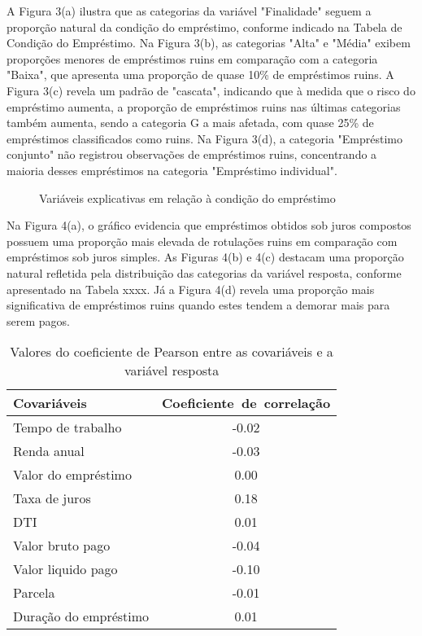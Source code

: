 A Figura 3(a) ilustra que as categorias da variável "Finalidade" seguem a proporção natural da condição do empréstimo,
conforme indicado na Tabela de Condição do Empréstimo. Na Figura 3(b), as categorias "Alta" e "Média"
exibem proporções menores de empréstimos ruins em comparação com a categoria "Baixa", que apresenta uma proporção de quase 10\% 
de empréstimos ruins. A Figura 3(c) revela um padrão de "cascata", indicando que à medida que o risco do 
empréstimo aumenta, a proporção de empréstimos ruins nas últimas categorias também aumenta, 
sendo a categoria G a mais afetada, com quase 25\% de empréstimos classificados como ruins. 
Na Figura 3(d), a categoria "Empréstimo conjunto" não registrou observações de empréstimos ruins, 
concentrando a maioria desses empréstimos na categoria "Empréstimo individual".


\begin{figure}[H]
  \centering
  \vspace{.5cm}
  \vspace{.5cm}

  \label{fig:exp_bar2}
  \caption{Variáveis explicativas em relação à condição do empréstimo}
\end{figure}

Na Figura 4(a), o gráfico evidencia que empréstimos obtidos sob juros compostos possuem uma proporção 
mais elevada de rotulações ruins em comparação com empréstimos sob juros simples. As Figuras 4(b) e 4(c)
destacam uma proporção natural refletida pela distribuição das categorias da variável resposta, 
conforme apresentado na Tabela xxxx. Já a Figura 4(d) revela uma proporção mais significativa
de empréstimos ruins quando estes tendem a demorar mais para serem pagos.

\begin{table}[H]
  \centering
  \begin{tabular}{lc}
    \hline
    \textbf{Covariáveis} & \mbox{\textbf{Coeficiente de correlação}} \\ 
    \hline
    Tempo de trabalho & -0.02 \\ 
    Renda anual & -0.03 \\ 
    Valor do empréstimo & 0.00 \\ 
    Taxa de juros & 0.18 \\ 
    DTI & 0.01 \\ 
    Valor bruto pago & -0.04 \\ 
    Valor liquido pago & -0.10 \\ 
    Parcela & -0.01 \\ 
    Duração do empréstimo &  0.01 \\
    \hline
  \end{tabular}
  \caption{Valores do coeficiente de Pearson entre as covariáveis e a variável resposta}
  \label{tab:coef_corr}
  \end{table}

